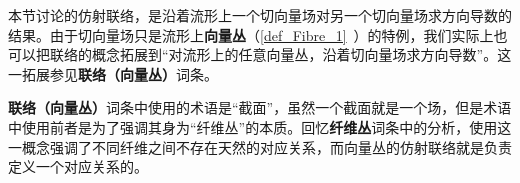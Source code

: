 本节讨论的仿射联络，是沿着流形上一个切向量场对另一个切向量场求方向导数的结果。由于切向量场只是流形上\textbf{向量丛}（\autoref{def_Fibre_1}~）的特例，我们实际上也可以把联络的概念拓展到“对流形上的任意向量丛，沿着切向量场求方向导数”。这一拓展参见\textbf{联络（向量丛）}词条。

\textbf{联络（向量丛）}词条中使用的术语是“截面”，虽然一个截面就是一个场，但是术语中使用前者是为了强调其身为“纤维丛”的本质。回忆\textbf{纤维丛}词条中的分析，使用这一概念强调了不同纤维之间不存在天然的对应关系，而向量丛的仿射联络就是负责定义一个对应关系的。



